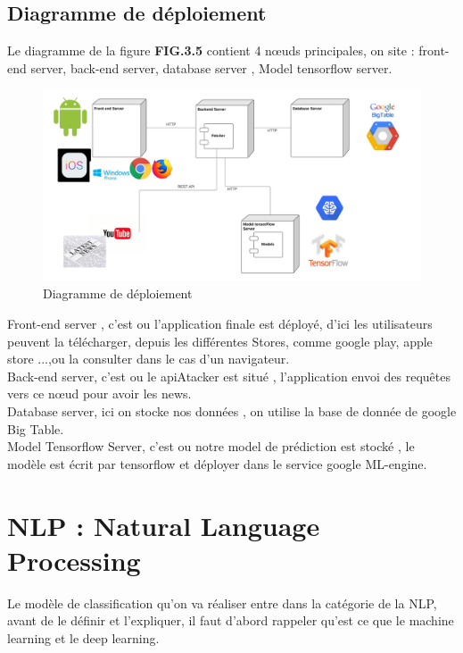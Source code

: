 \subsection{Diagramme de déploiement}
Le diagramme de la figure \textbf{FIG.3.5} contient 4 nœuds principales, on site : front-end server, back-end server, database server , Model tensorflow server.
\begin{figure}[H]
	\includegraphics[width=\linewidth]{Images/Deployment_Diagram_Sanadtech.png}
	\caption{Diagramme de déploiement}
	\label{fig:deployment}
\end{figure}
Front-end server , c'est ou l'application finale est déployé, d'ici les utilisateurs peuvent la télécharger, depuis les différentes Stores, comme google play, apple store ...,ou la consulter dans le cas d'un navigateur.\\[0.2cm]
Back-end server, c'est ou le apiAtacker est situé , l'application envoi des requêtes vers ce nœud pour avoir les news.\\[0.2cm]
Database server, ici on stocke nos données , on utilise la base de donnée de google Big Table.\\[0.2cm]
Model Tensorflow Server, c'est ou notre model de prédiction est stocké , le modèle est écrit par tensorflow et déployer dans le service google ML-engine.



\section{NLP : Natural Language Processing}
Le modèle de classification qu'on va réaliser entre  dans la catégorie de la NLP, avant de le définir et l'expliquer, il faut d'abord rappeler qu'est ce que le machine learning et le deep learning.
